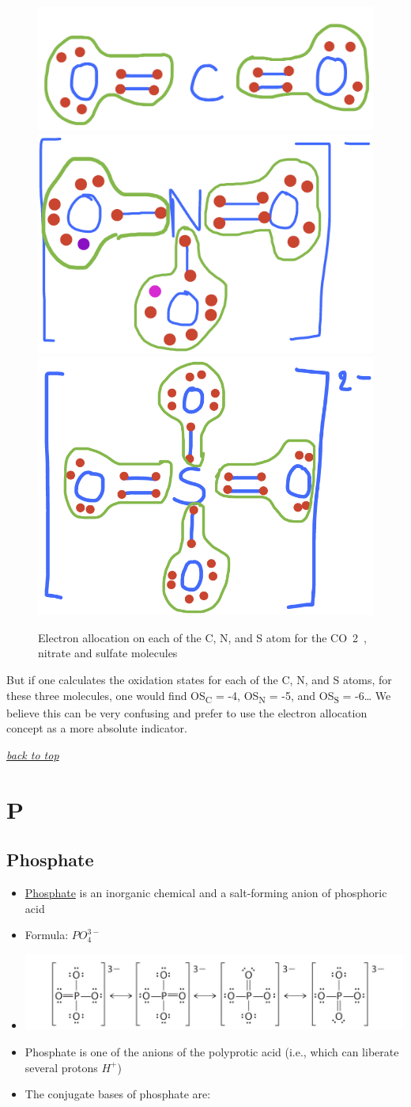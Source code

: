 \documentclass[]{book}
\providecommand{\tightlist}{%
  \setlength{\itemsep}{0pt}\setlength{\parskip}{0pt}}
\theoremstyle{definition}
\theoremstyle{definition}
\theoremstyle{definition}
\theoremstyle{remark}
\begin{document}
\begin{figure}

{\centering \includegraphics[width=0.2\linewidth]{pictures/ElecAlloc_CO2} \includegraphics[width=0.2\linewidth]{pictures/ElecAlloc_NO3-} \includegraphics[width=0.2\linewidth]{pictures/ElecAlloc_SO42-} 

}

\caption{Electron allocation on each of the C, N, and S atom for the CO~2~, nitrate and sulfate molecules}\label{fig:ElecAlloc-CO2-NO3-SO4}
\end{figure}

But if one calculates the oxidation states for each of the C, N, and S
atoms, for these three molecules, one would find OS\textsubscript{C} =
-4, OS\textsubscript{N} = -5, and OS\textsubscript{S} = -6\ldots{} We
believe this can be very confusing and prefer to use the electron
allocation concept as a more absolute indicator.

\emph{\protect\hyperlink{top}{back to top}}

\section{P}\label{p}

\subsection{Phosphate}\label{phosphate}

\begin{itemize}
\tightlist
\item
  \href{https://en.wikipedia.org/wiki/Phosphate}{Phosphate} is an
  inorganic chemical and a salt-forming anion of phosphoric acid
\item
  Formula: \(PO_4^{3-}\)
\item
  \includegraphics{pictures/phosphate_lewis_structure.jpg}
\item
  Phosphate is one of the anions of the polyprotic acid (i.e., which can
  liberate several protons \(H^{+}\))
\item
  The conjugate bases of phosphate are:
\end{itemize}
\end{document}
